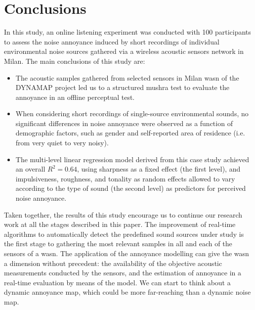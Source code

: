 

\section{Conclusions}

In this study, an online listening experiment was conducted with 100 participants to assess the noise annoyance induced by short recordings of individual environmental noise sources gathered via a wireless acoustic sensors network in Milan. The main conclusions of this study are:

\begin{itemize}
  \item The acoustic samples gathered from selected sensors in Milan \gls{wasn} of the DYNAMAP project led us to a structured \gls{mushra} test to evaluate the annoyance in an offline perceptual test.
  \item When considering short recordings of single-source environmental sounds, no significant differences in noise annoyance were observed as a function of demographic factors, such as gender and self-reported area of residence (i.e. from very quiet to very noisy).
  \item The multi-level linear regression model derived from this case study achieved an overall $R^2=0.64$, using sharpness as a fixed effect (the first level), and impulsiveness, roughness, and tonality as random effects allowed to vary according to the type of sound (the second level) as predictors for perceived noise annoyance.
\end{itemize}

Taken together, the results of this study encourage us to continue our research work at all the stages described in this paper. The improvement of real-time algorithms to automatically detect the predefined sound sources under study is the first stage to gathering the most relevant samples in all and each of the sensors of a \gls{wasn}. The application of the annoyance modelling can give the \gls{wasn} a dimension without precedent: the availability of the objective acoustic measurements conducted by the sensors, and the estimation of annoyance in a real-time evaluation by means of the model. We can start to think about a dynamic annoyance map, which could be more far-reaching than a dynamic noise map.

